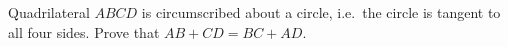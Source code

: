 Quadrilateral $ABCD$ is circumscribed about a circle, i.e.\ the circle is tangent to all four sides. Prove that $AB+CD=BC+AD$.
